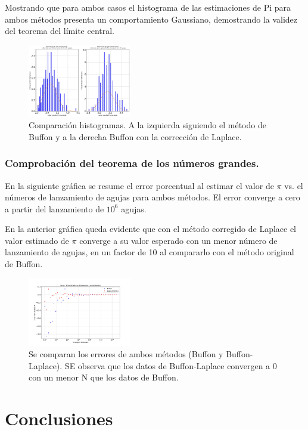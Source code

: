 \documentclass{rbf}
\begin{document}
Mostrando que para ambos casos el histograma de las estimaciones de Pi para ambos métodos presenta un comportamiento Gaussiano, demostrando la validez del teorema del límite central.
\begin{figure}[h]
 \centering
  \includegraphics[width=0.4\textwidth]{figures/pi_N1.000e+02k200.jpg}
	\caption{Comparación histogramas. A la izquierda siguiendo el método de Buffon y a la derecha Buffon con la corrección de Laplace. }
 \label{buff10}
\end{figure}
\subsubsection{Comprobación del teorema de los números grandes.}
En la siguiente gráfica se resume el error porcentual al estimar el valor de $\pi$ vs. el números de lanzamiento de agujas para ambos métodos. El error converge a cero a partir del lanzamiento de $10^6$ agujas.

En la anterior gráfica queda evidente que con el método corregido de Laplace el valor estimado de $\pi$ converge a su valor esperado con un menor número de lanzamiento de agujas, en un factor de 10 al compararlo con el método original de Buffon. 
\begin{figure}[h]
 \centering
  \includegraphics[width=0.4\textwidth]{figures/Errores.jpg}
	\caption{Se comparan los errores de ambos métodos (Buffon y Buffon-Laplace). SE observa que los datos de Buffon-Laplace convergen a 0 con un menor N que los datos de Buffon.}
 \label{buff11}
\end{figure}

\section{Conclusiones}
\end{document}

